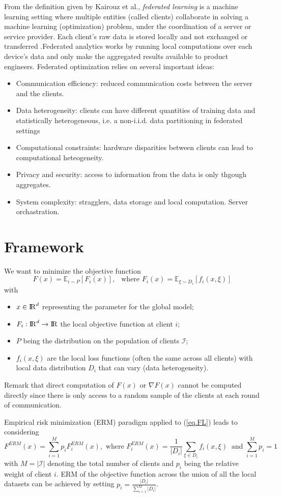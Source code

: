 \documentclass[10pt,a4paper]{book}
\theoremstyle{definition}
\theoremstyle{plain}
\theoremstyle{remark}
\newcommand \Esp {\mathbb{E}}
\def\R{{\rm I\kern-0.16em R}}
\begin{document}
From the definition given by Kairouz et al., \emph{federated learning} is a machine learning setting where multiple entities (called clients) collaborate in solving a machine learning (optimization) problem, under the coordination of a server or service provider. Each client's raw data is stored locally and not exchanged or transferred .Federated analytics works by running local computations over each device's data and only make the aggregated results available to product engineers. Federated optimization relies on several important ideas:
\begin{itemize}
\item Communication efficiency: reduced communication costs between the server and the clients.
\item Data heterogeneity: clients can have different quantities of training data and statistically heterogeneous, i.e. a non-i.i.d. data partitioning in federated settings
\item Computational constraints: hardware disparities between clients can lead to computational heteogeneity.
\item Privacy and security: access to information from the data is only thgough aggregates.
\item System complexity: stragglers, data storage and local computation. Server orchastration. 
\end{itemize}
\section{Framework}
We want to minimize the objective function
\begin{equation}\label{eq.FL}
F(x)=\Esp_{i\sim P}[F_i(x)],~~\text{ where }F_i(x)=\Esp_{\xi\sim D_i}[f_i(x,\xi)]
\end{equation}
with 
\begin{itemize}
\item $x\in \R^d$ representing the parameter for the global model;
\item $F_i: \R^d\to \R$ the local objective function at client $i$;
\item $P$ being the distribution on the population of clients $\mathcal{I}$;
\item $f_i(x,\xi)$ are the local loss functions (often the same across all clients) with local data distribution $D_i$ that can vary (data heterogeneity).
\end{itemize}
Remark that direct computation of $F(x)$ or $\nabla F(x)$ cannot be computed directly since there is only access to a random sample of the clients at each round of communication. \par \medskip
Empirical risk minimization (ERM) paradigm applied to (\ref{eq.FL}) leads to considering
$$F^{ERM}(x)=\sum_{i=1}^{M}p_iF_i^{ERM}(x), \text{ where } F_i^{ERM}(x)=\frac{1}{|D_i|}\sum_{\xi \in D_i}f_i(x,\xi)~\text{ and }\sum_{i=1}^{M}p_i=1$$
with $M=|\mathcal{I}|$ denoting the total number of clients and $p_i$ being the relative weight of client $i$. ERM of the objective function across the union of all the local datasets can be achieved by setting $p_i=\frac{|D_i|}{\sum_{i=1}^{M}|D_i|}$. 
\end{document}
